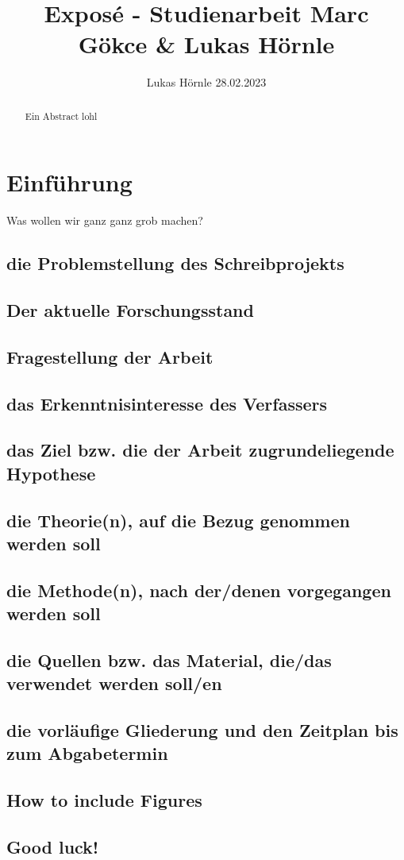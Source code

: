 \documentclass{article}
\title{Exposé - Studienarbeit Marc Gökce & Lukas Hörnle}
\author{Lukas Hörnle 28.02.2023}
\begin{document}
 \maketitle

 \begin{abstract}
  Ein Abstract lohl
 \end{abstract}

 \section{Einführung}
 Was wollen wir ganz ganz grob machen?
 \subsection{die Problemstellung des Schreibprojekts}
 \subsection{Der aktuelle Forschungsstand}
 \subsection{Fragestellung der Arbeit}
 \subsection{das Erkenntnisinteresse des Verfassers}
 \subsection{das Ziel bzw. die der Arbeit zugrundeliegende Hypothese}
 \subsection{die Theorie(n), auf die Bezug genommen werden soll}
 \subsection{die Methode(n), nach der/denen vorgegangen werden soll}
 \subsection{die Quellen bzw. das Material, die/das verwendet werden soll/en}
 \subsection{die vorläufige Gliederung und den Zeitplan bis zum Abgabetermin}
 \subsection{How to include Figures}
 \subsection{Good luck!}
\end{document}
